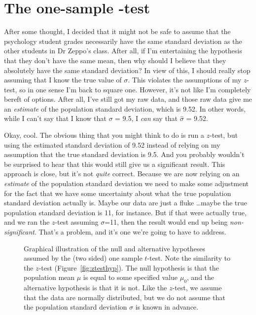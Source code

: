 \section{The one-sample \texorpdfstring{}{}-test~\label{sec:onesamplettest}}

After some thought, I decided that it might not be safe to assume that the psychology student grades necessarily have the same standard deviation as the other students in Dr Zeppo's class. After all, if I'm entertaining the hypothesis that they don't have the same mean, then why should I believe that they absolutely have the same standard deviation? In view of this, I should really stop assuming that I know the true value of $\sigma$. This violates the assumptions of my $z$-test, so in one sense I'm back to square one. However, it's not like I'm completely bereft of options. After all, I've still got my raw data, and those raw data give me an {\it estimate} of the population standard deviation, which is 9.52. In other words, while I can't say that I know that $\sigma$ = 9.5, I {\it can} say that $\hat\sigma$ = 9.52. 

Okay, cool. The obvious thing that you might think to do is run a $z$-test, but using the estimated standard deviation of 9.52 instead of relying on my assumption that the true standard deviation is 9.5. And you probably wouldn't be surprised to hear that this would still give us a significant result. This approach is close, but it's not {\it quite} correct. Because we are now relying on an {\it estimate} of the population standard deviation we need to make some adjustment for the fact that we have some uncertainty about what the true population standard deviation actually is. Maybe our data are just a fluke \ldots maybe the true population standard deviation is 11, for instance. But if that were actually true, and we ran the $z$-test assuming $\sigma$=11, then the result would end up being {\it non-significant}. That's a problem, and it's one we're going to have to address.

\begin{figure}[htb]
\begin{center}
\caption{Graphical illustration of the null and alternative hypotheses assumed by the (two sided) one sample \texorpdfstring{$t$}{}-test. Note the similarity to the \texorpdfstring{$z$}{}-test (Figure~\ref{fig:ztesthyp}). The null hypothesis is that the population mean \texorpdfstring{$\mu$}{} is equal to some specified value \texorpdfstring{$\mu_0$}{}, and the alternative hypothesis is that it is not. Like the \texorpdfstring{$z$}{}-test, we assume that the data are normally distributed, but we do not assume that the population standard deviation \texorpdfstring{$\sigma$}{} is known in advance.}
\HR
\label{fig:ttesthyp_onesample}
\end{center}
\end{figure}

